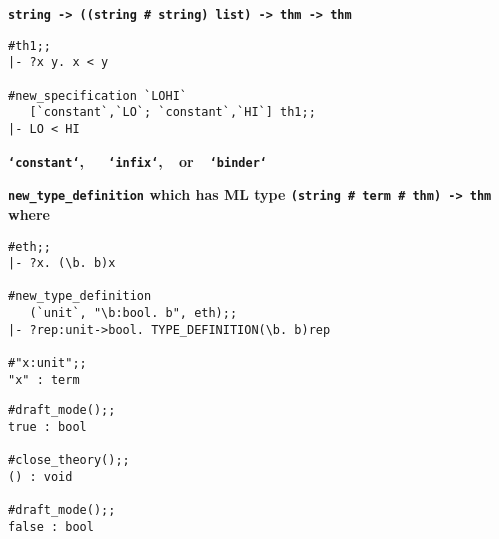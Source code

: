 
\vskip 5mm
\bspindent\Large\bf
   \verb!string -> ((string # string) list) -> thm -> thm!
\espindent
\vskip 7mm

\begin{session}\begin{verbatim}
#th1;;
|- ?x y. x < y

#new_specification `LOHI`
   [`constant`,`LO`; `constant`,`HI`] th1;;
|- LO < HI
\end{verbatim}\end{session}

\vskip7mm
\vskip5mm
\bspindent\LARGE\bf
{\tt `constant`},~~~{\tt `infix`},~~or~~{\tt `binder`}
\espindent




\vskip5mm
\bspindent\LARGE\bf
\verb!new_type_definition!
\espindent
\vskip5mm
\bpindent\LARGE\bf
which has ML type
\epindent
\vskip5mm
\bspindent\LARGE\bf
\verb!(string # term # thm) -> thm!
\espindent
\vskip5mm
\bpindent\LARGE\bf
where
\epindent
\vskip5mm

\vskip 7mm
\vskip4mm
\begin{session}\begin{verbatim}
#eth;;
|- ?x. (\b. b)x

#new_type_definition
   (`unit`, "\b:bool. b", eth);;
|- ?rep:unit->bool. TYPE_DEFINITION(\b. b)rep

#"x:unit";;
"x" : term
\end{verbatim}\end{session}




\vskip4mm
\begin{session}\begin{verbatim}
#draft_mode();;
true : bool

#close_theory();;
() : void

#draft_mode();;
false : bool
\end{verbatim}\end{session}

